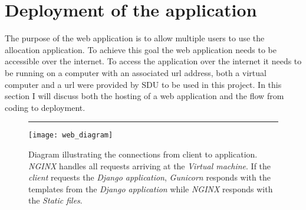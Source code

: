 \section{Deployment of the application}\label{deployment}
The purpose of the web application is to allow multiple users to use the allocation application. To achieve this goal the web application needs to be accessible over the internet. To access the application over the internet it needs to be running on a computer with an associated url address, both a virtual computer and a url were provided by SDU to be used in this project. In this section I will discuss both the hosting of a web application and the flow from coding to deployment.\\
\begin{figure}[b!]
\centering
\hrule
\vspace*{0.2cm}
\texttt{[image: web\_diagram]}
\caption{Diagram illustrating the connections from client to application. \emph{NGINX} handles all requests arriving at the \emph{Virtual machine}. If the \emph{client} requests the \emph{Django application}, \emph{Gunicorn} responds with the templates from the \emph{Django application} while \emph{NGINX} responds with the \emph{Static files}. }
\label{fig:web_dia}
\end{figure}
